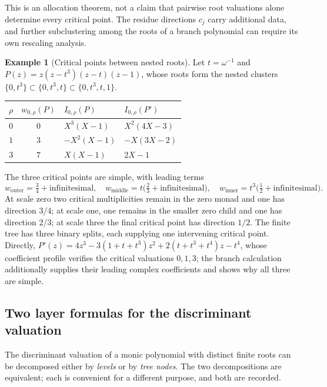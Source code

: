\documentclass[11pt,letterpaper]{article}
\numberwithin{equation}{section}
\theoremstyle{definition}
\newtheorem{example}[theorem]{Example}
\theoremstyle{remark}\newtheorem{remark}[theorem]{Remark}
\begin{document}
This is an allocation theorem, not a claim that pairwise root valuations alone
determine every critical point. The residue directions $c_j$ carry additional
data, and further subclustering among the roots of a branch polynomial can
require its own rescaling analysis.

\begin{example}[Critical points between nested roots]\label{polynomial:ex:nested}
Let $t=\omega^{-1}$ and $P(z)=z(z-t^3)(z-t)(z-1)$, whose roots form the nested
clusters $\{0,t^3\}\subset\{0,t^3,t\}\subset\{0,t^3,t,1\}$.
\begin{center}
\begin{tabular}{@{}ccll@{}}
\toprule
$\rho$ & $w_{0,\rho}(P)$ & $I_{0,\rho}(P)$ & $I_{0,\rho}(P')$\\
\midrule
$0$ & $0$ & $X^3(X-1)$ & $X^2(4X-3)$\\
$1$ & $3$ & $-X^2(X-1)$ & $-X(3X-2)$\\
$3$ & $7$ & $X(X-1)$ & $2X-1$\\
\bottomrule
\end{tabular}
\end{center}
The three critical points are simple, with leading terms
\begin{equation}\label{polynomial:eq:nestedcritical}
 w_{\mathrm{outer}}=\tfrac34+\text{infinitesimal},\quad
 w_{\mathrm{middle}}=t\bigl(\tfrac23+\text{infinitesimal}\bigr),\quad
 w_{\mathrm{inner}}=t^3\bigl(\tfrac12+\text{infinitesimal}\bigr).
\end{equation}
At scale zero two critical multiplicities remain in the zero monad and one has
direction $3/4$; at scale one, one remains in the smaller zero child and one
has direction $2/3$; at scale three the final critical point has direction
$1/2$. The finite tree has three binary splits, each supplying one intervening
critical point. Directly,
$P'(z)=4z^3-3(1+t+t^3)z^2+2(t+t^3+t^4)z-t^4$, whose coefficient profile
verifies the critical valuations $0,1,3$; the branch calculation additionally
supplies their leading complex coefficients and shows why all three are
simple.
\end{example}

\subsection{Two layer formulas for the discriminant valuation}
\label{polynomial:subsec:disclayers}
The discriminant valuation of a monic polynomial with distinct finite roots
can be decomposed either by \emph{levels} or by \emph{tree nodes}. The two
decompositions are equivalent; each is convenient for a different purpose, and
both are recorded.
\end{document}
